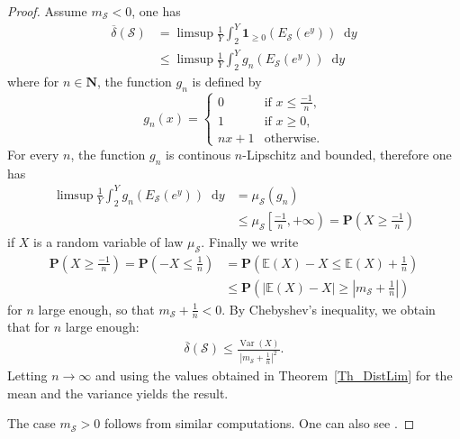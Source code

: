 \documentclass[a4paper,10pt]{amsart}
\theoremstyle{plain}
\theoremstyle{definition}
\begin{document}
\begin{proof}
Assume $m_{\mathcal{S}}<0$,
one has
\begin{align*}
\overline{\delta}(\mathcal{S}) &= \limsup\frac{1}{Y}\int_{2}^{Y}\mathbf{1}_{\geq 0}(E_{\mathcal{S}}(e^{y})){\mathop{}\!\mathrm{d}} y \\
&\leq \limsup\frac{1}{Y}\int_{2}^{Y}g_{n}(E_{\mathcal{S}}(e^{y})){\mathop{}\!\mathrm{d}} y
\end{align*}
where for $n\in\mathbf{N}$, the function $g_{n}$ is defined by
$$g_{n}(x)=\left\lbrace
\begin{array}{ll}
0 & \mbox{if $x\leq \frac{-1}{n}$,}\\
1 & \mbox{if $x\geq 0$,}\\
nx  + 1 & \mbox{otherwise.}
\end{array}
\right.$$
For every $n$, the function $g_{n}$ is continous $n$-Lipschitz and bounded, 
therefore one has
\begin{align*}
\limsup\frac{1}{Y}\int_{2}^{Y}g_{n}(E_{\mathcal{S}}(e^{y})){\mathop{}\!\mathrm{d}} y &= \mu_{\mathcal{S}}(g_{n}) \\
 &\leq \mu_{\mathcal{S}}\left[\frac{-1}{n},+\infty\right)  = \mathbf{P}\left(X \geq \frac{-1}{n}\right)
\end{align*}
if $X$ is a random variable of law $\mu_{\mathcal{S}}$.
Finally we write
\begin{align*}
\mathbf{P}\left(X \geq \frac{-1}{n}\right) = \mathbf{P}\left(-X \leq \frac{1}{n}\right) 
&=  \mathbf{P}\left(\mathbb{E}(X)-X \leq \mathbb{E}(X) +\frac{1}{n}\right)  \\
&\leq \mathbf{P}\left(\lvert\mathbb{E}(X)-X \rvert \geq \left\lvert m_{\mathcal{S}} +\frac{1}{n}\right\rvert\right)
\end{align*}
for $n$ large enough, so that $m_{\mathcal{S}} +\frac{1}{n} <0$.
By Chebyshev's inequality, we obtain that for $n$ large enough:
\begin{align*}
\overline{\delta}(\mathcal{S}) \leq \frac{\operatorname{Var}(X)}{\left\lvert m_{\mathcal{S}} +\frac{1}{n}\right\rvert^{2}}.
\end{align*}
Letting $n\rightarrow \infty$ and using the values obtained in Theorem~\ref{Th_DistLim} for the mean and the variance yields the result.

The case $m_{\mathcal{S}}>0$ follows from similar computations. One can also see \cite[Lem. 2.7]{FioEC}.
\end{proof}
\end{document}
